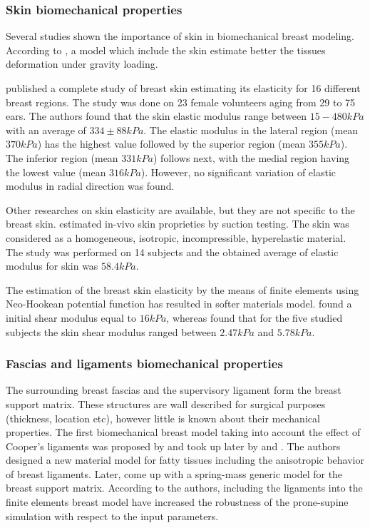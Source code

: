 \subsubsection*{Skin biomechanical properties}
Several studies shown the importance of skin in biomechanical breast modeling. According to \cite{carter_biomechanical_2009}, a model which include the skin estimate better the tissues deformation under gravity loading.

 \cite{sutradhar_vivo_2013} published a complete study of breast skin estimating its elasticity for 16 different breast regions. The study was done on 23 female volunteers aging from 29 to 75 ears. The authors found that the skin elastic modulus range between $15-480 kPa$ with an average of $334\pm 88 kPa$. The elastic modulus in the lateral region (mean $370 kPa$) has the highest value followed by the superior region (mean $355 kPa$). The inferior region (mean $331 kPa$) follows next, with the medial region having the
lowest value (mean $316 kPa$). However, no significant variation of elastic modulus in radial direction was found. 
 
Other researches on skin elasticity are available, but they are not specific to the breast skin. \cite{hendriks_relative_2006} estimated in-vivo skin proprieties by suction testing. The skin was considered as a homogeneous, isotropic, incompressible, hyperelastic material. The study was performed on 14 subjects and the obtained average of elastic modulus for skin was $58.4 kPa$.

The estimation of the breast skin elasticity by the means of finite elements using Neo-Hookean potential function has resulted in softer materials model. \cite{carter_determining_2009} found a initial shear modulus equal to $16kPa$, whereas \cite{han_nonlinear_2014} found that for the five studied subjects the skin shear modulus ranged between $2.47 kPa$ and $5.78kPa$. 

\subsubsection*{Fascias and ligaments biomechanical properties}
The surrounding breast fascias and the supervisory ligament form the breast support matrix. These structures are wall described for surgical purposes (thickness, location etc), however little is known about their mechanical properties. The first biomechanical breast model taking into account the effect of Cooper's ligaments was proposed by \cite{azar_methods_2002} and took up later by \cite{pathmanathan_predicting_2008} and \cite{han_development_2012}. The authors designed a new material model for fatty tissues including the anisotropic behavior of breast ligaments. Later, \cite{georgii_simulation_2016} come up with a spring-mass generic model for the breast support matrix. According to the authors, including the ligaments into the finite elements breast model have increased the robustness of the prone-supine simulation with respect to the input parameters. 

